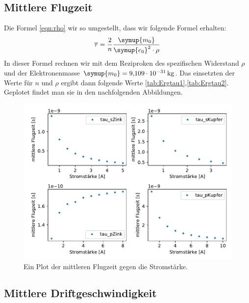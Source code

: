     \subsection{Mittlere Flugzeit}

    
    Die Formel \ref{eqn:rho} wir so umgestellt, dass wir folgende Formel erhalten:
    \begin{equation}
        \overline{\tau} =\frac{2}{n}\frac{\symup{m_0}}{\symup{e_0}^2 \cdot \rho}
    \end{equation}
    In dieser Formel rechnen wir mit dem Reziproken des spezifischen Widerstand $\rho$ und der Elektronenmasse
    $\symup{m_0} = \SI{9.109e-31}{\kilogram}$. Das einsetzten der Werte für $n$ und $\rho$ ergibt dann folgende Werte \ref{tab:Ergtau1},\ref{tab:Ergtau2}.
    Geplotet findet man sie in den nachfolgenden Abbildungen.

    \begin{figure}[H]
        \centering
        \includegraphics[width=1.1\textwidth]{build/tau.pdf}
        \caption{Ein Plot der mittleren Flugzeit gegen die Stromstärke.}
        \label{img:tau}
    \end{figure}


    \subsection{Mittlere Driftgeschwindigkeit}


